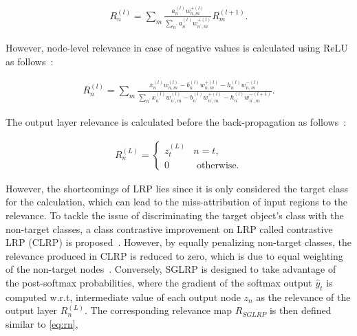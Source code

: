 \vspace{-4mm}
\begin{align}
    R_{n}^{(l)}=\sum_{m} \frac{a_{n}^{(l)} w_{n, m}^{+(l)}}{\sum_{n^{\prime}} a_{n^{\prime}}^{(l)} w_{n^{\prime}, m}^{+(l)}} R_{m}^{(l+1)}.
    \label{eq:rn}
\end{align}

However, node-level relevance in case of negative values is calculated using ReLU as follows~\cite{LRP2}:

\vspace{-4mm}
\begin{align}
    R_{n}^{(l)}=\sum_{m} \frac{x_{n}^{(l)} w_{n, m}^{(l)}-b_{n}^{(l)} w_{n, m}^{+(l)}-h_{n}^{(l)} w_{n, m}^{-(l)}}{\sum_{n^{\prime}} x_{n^{\prime}}^{(l)} w_{n^{\prime}, m}^{(l)}-b_{n^{\prime}}^{(l)} w_{n^{\prime}, m}^{+(l)}-h_{n^{\prime}}^{(l)} w_{n^{\prime}, m}^{-(l+1)}}.
    \label{eq:rn_neg}
\end{align}

The output layer relevance is calculated before the back-propagation as follows~\cite{LRP2}:

\vspace{-4mm}
\begin{align}
    R_{n}^{(L)}=\left\{\begin{array}{ll}
    {z_{t}^{(L)}} & {n=t}, \\
    {0} & {\text { otherwise.}}
    \end{array}\right.
    \label{eq:rn}
\end{align}

\hspace*{3.5mm} However, the shortcomings of LRP lies since it is only considered the target class for the calculation, which can lead to the miss-attribution of input regions to the relevance. To tackle the issue of discriminating the target object’s class with the non-target classes, a class contrastive improvement on LRP called contrastive LRP (CLRP) is proposed~\cite{LRP3}. However, by equally penalizing non-target classes, the relevance produced in CLRP is reduced to zero, which is due to equal weighting of the non-target nodes~\cite{ LRP2}. Conversely, SGLRP is designed to take advantage of the post-softmax probabilities, where the gradient of the softmax output $\hat{y}_{t}$ is computed w.r.t, intermediate value of each output node $z_{n}$ as the relevance of the output layer $R_{n}^{(L)}$. The corresponding relevance map $R_{SGLRP}$ is then defined similar to \cref{eq:rn},

